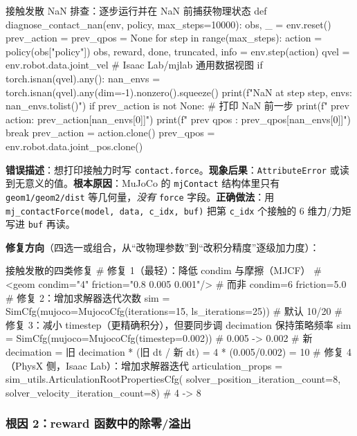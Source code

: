 \begin{codebox}[Python]{接触发散 NaN 排查：逐步运行并在 NaN 前捕获物理状态}
def diagnose_contact_nan(env, policy, max_steps=10000):
    obs, _ = env.reset()
    prev_action = prev_qpos = None
    for step in range(max_steps):
        action = policy(obs["policy"])
        obs, reward, done, truncated, info = env.step(action)
        qvel = env.robot.data.joint_vel                 # Isaac Lab/mjlab 通用数据视图
        if torch.isnan(qvel).any():
            nan_envs = torch.isnan(qvel).any(dim=-1).nonzero().squeeze()
            print(f"NaN at step {step}, envs: {nan_envs.tolist()}")
            if prev_action is not None:                 # 打印 NaN 前一步
                print(f"  prev action: {prev_action[nan_envs[0]]}")
                print(f"  prev qpos  : {prev_qpos[nan_envs[0]]}")
            break
        prev_action = action.clone()
        prev_qpos   = env.robot.data.joint_pos.clone()
\end{codebox}

\begin{pitfall}
\textbf{错误描述}：想打印接触力时写 \verb|contact.force|。\textbf{现象后果}：\verb|AttributeError| 或读到无意义的值。\textbf{根本原因}：MuJoCo 的 \verb|mjContact| 结构体里只有 \verb|geom1/geom2/dist| 等几何量，\emph{没有} \verb|force| 字段。\textbf{正确做法}：用 \verb|mj_contactForce(model, data, c_idx, buf)| 把第 \verb|c_idx| 个接触的 6 维力/力矩写进 \verb|buf| 再读。
\end{pitfall}

\textbf{修复方向}（四选一或组合，从“改物理参数”到“改积分精度”逐级加力度）：

\begin{codebox}[Python]{接触发散的四类修复}
# 修复 1（最轻）：降低 condim 与摩擦（MJCF）
#   <geom condim="4" friction="0.8 0.005 0.001"/>   # 而非 condim=6 friction=5.0
# 修复 2：增加求解器迭代次数
sim = SimCfg(mujoco=MujocoCfg(iterations=15, ls_iterations=25))   # 默认 10/20
# 修复 3：减小 timestep（更精确积分），但要同步调 decimation 保持策略频率
sim = SimCfg(mujoco=MujocoCfg(timestep=0.002))                    # 0.005 -> 0.002
#   新 decimation = 旧 decimation * (旧 dt / 新 dt) = 4 * (0.005/0.002) = 10
# 修复 4（PhysX 侧，Isaac Lab）：增加求解器迭代
articulation_props = sim_utils.ArticulationRootPropertiesCfg(
    solver_position_iteration_count=8, solver_velocity_iteration_count=8)  # 4 -> 8
\end{codebox}

\subsubsection{根因 2：reward 函数中的除零/溢出}

